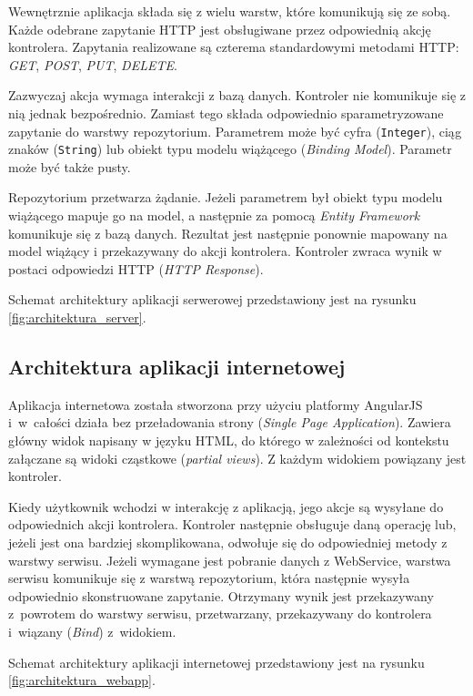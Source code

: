 \documentclass{book}
\begin{document}
			Wewnętrznie aplikacja składa się z wielu warstw, które komunikują się ze sobą. Każde odebrane zapytanie HTTP jest obsługiwane przez odpowiednią akcję kontrolera. Zapytania realizowane są czterema standardowymi metodami HTTP: \emph{GET}, \emph{POST}, \emph{PUT}, \emph{DELETE}.
			
			Zazwyczaj akcja wymaga interakcji z bazą danych. Kontroler nie komunikuje się z nią jednak bezpośrednio. Zamiast tego składa odpowiednio sparametryzowane zapytanie do warstwy repozytorium. Parametrem może być cyfra (\texttt{Integer}), ciąg znaków (\texttt{String}) lub obiekt typu modelu wiążącego (\emph{Binding Model}). Parametr może być także pusty. 
			
			Repozytorium przetwarza żądanie. Jeżeli parametrem był obiekt typu modelu wiążącego mapuje go na model, a następnie za pomocą \emph{Entity Framework} komunikuje się z bazą danych. Rezultat jest następnie ponownie mapowany na model wiążący i przekazywany do akcji kontrolera. Kontroler zwraca wynik w postaci odpowiedzi HTTP (\emph{HTTP Response}).
			
			Schemat architektury aplikacji serwerowej przedstawiony jest na rysunku \ref{fig:architektura_server}. 			
			
			\subsection{Architektura aplikacji internetowej}		
			
			

			Aplikacja internetowa została stworzona przy użyciu platformy AngularJS i~w~całości działa bez przeładowania strony (\emph{Single Page Application}). Zawiera główny widok napisany w języku HTML, do którego w zależności od kontekstu załączane są widoki cząstkowe (\emph{partial views}). Z każdym widokiem powiązany jest kontroler. 
			
			Kiedy użytkownik wchodzi w interakcję z aplikacją, jego akcje są wysyłane do odpowiednich akcji kontrolera. Kontroler następnie obsługuje daną operację lub, jeżeli jest ona bardziej skomplikowana, odwołuje się do odpowiedniej metody z warstwy serwisu. Jeżeli wymagane jest pobranie danych z WebService, warstwa serwisu komunikuje się z warstwą repozytorium, która następnie wysyła odpowiednio skonstruowane zapytanie. Otrzymany wynik jest przekazywany z~powrotem do warstwy serwisu, przetwarzany, przekazywany do kontrolera i~wiązany (\emph{Bind}) z~widokiem.								

			Schemat architektury aplikacji internetowej przedstawiony jest na rysunku \ref{fig:architektura_webapp}.	
			
\end{document}
